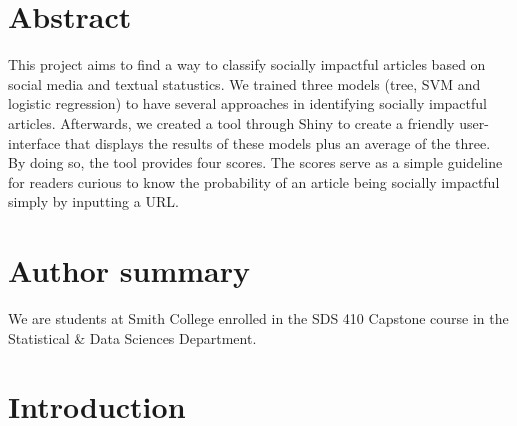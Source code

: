 \documentclass[10pt,letterpaper]{article}
\date{}
\newcommand{\getIndex}[2]{
  \ForEach{,}{\IfEq{#1}{\thislevelitem}{\number\thislevelcount\ExitForEach}{}}{#2}
}
\newcommand{\getAff}[1]{
  \getIndex{#1}{Smith College}
}
\begin{document}
\vspace*{0.2in}

\section*{Abstract}
This project aims to find a way to classify socially impactful articles
based on social media and textual statustics. We trained three models
(tree, SVM and logistic regression) to have several approaches in
identifying socially impactful articles. Afterwards, we created a tool
through Shiny to create a friendly user-interface that displays the
results of these models plus an average of the three. By doing so, the
tool provides four scores. The scores serve as a simple guideline for
readers curious to know the probability of an article being socially
impactful simply by inputting a URL.

\section*{Author summary}
We are students at Smith College enrolled in the SDS 410 Capstone course
in the Statistical \& Data Sciences Department.

\linenumbers

\section{Introduction}\label{introduction}
\end{document}
